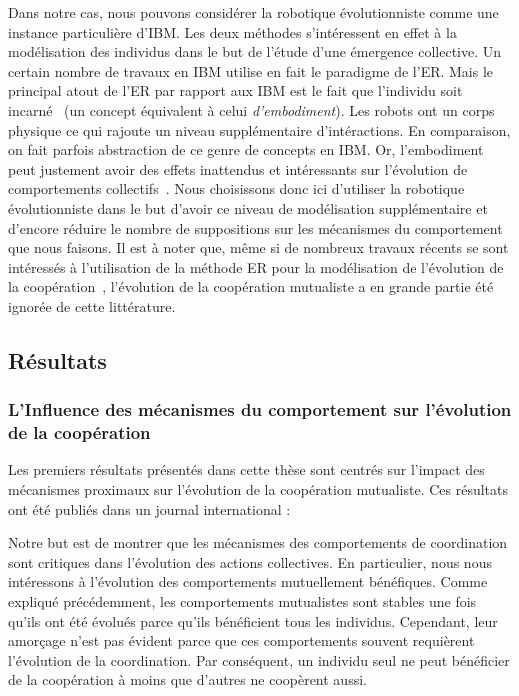 		Dans notre cas, nous pouvons considérer la robotique évolutionniste comme une instance particulière d'IBM. Les deux méthodes s'intéressent en effet à la modélisation des individus dans le but de l'étude d'une émergence collective. Un certain nombre de travaux en IBM utilise en fait le paradigme de l'ER. Mais le principal atout de l'ER par rapport aux IBM est le fait que l'individu soit incarné~\parencite{Mitri2013} (un concept équivalent à celui \emph{d'embodiment}). Les robots ont un corps physique ce qui rajoute un niveau supplémentaire d'intéractions. En comparaison, on fait parfois abstraction de ce genre de concepts en IBM. Or, l'embodiment peut justement avoir des effets inattendus et intéressants sur l'évolution de comportements collectifs~\parencite{Mitri2009}. Nous choisissons donc ici d'utiliser la robotique évolutionniste dans le but d'avoir ce niveau de modélisation supplémentaire et d'encore réduire le nombre de suppositions sur les mécanismes du comportement que nous faisons. Il est à noter que, même si de nombreux travaux récents se sont intéressés à l'utilisation de la méthode ER pour la modélisation de l'évolution de la coopération~\parencite{Waibel2009, Waibel2011, Montanier2011, Ferrante2015}, l'évolution de la coopération mutualiste a en grande partie été ignorée de cette littérature.


	\subsection{Résultats}

		\subsubsection{L'Influence des mécanismes du comportement sur l'évolution de la coopération}

			Les premiers résultats présentés dans cette thèse sont centrés sur l'impact des mécanismes proximaux sur l'évolution de la coopération mutualiste. Ces résultats ont été publiés dans un journal international :

			\begin{quote}
			\end{quote}

			Notre but est de montrer que les mécanismes des comportements de coordination sont critiques dans l'évolution des actions collectives. En particulier, nous nous intéressons à l'évolution des comportements mutuellement bénéfiques. Comme expliqué précédemment, les comportements mutualistes sont stables une fois qu'ils ont été évolués parce qu'ils bénéficient tous les individus. Cependant, leur amorçage n'est pas évident parce que ces comportements souvent requièrent l'évolution de la coordination. Par conséquent, un individu seul ne peut bénéficier de la coopération à moins que d'autres ne coopèrent aussi.

